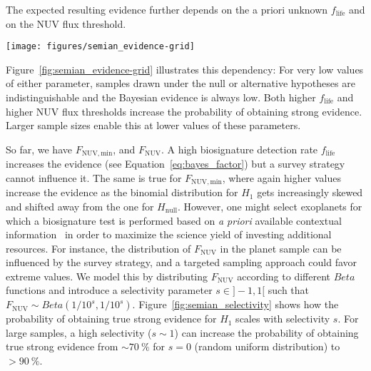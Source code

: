 \documentclass[twocolumn,twocolappendix,linenumbers]{aastex631}
\begin{document}
The expected resulting evidence further depends on the a priori unknown  $f_\mathrm{life}$ and on the \gls{NUV} flux threshold.
\begin{figure*}
    \begin{centering}
        \texttt{[image: figures/semian\_evidence-grid]}
        \caption{Probability of obtaining true strong evidence for different abiogenesis rates, \gls{NUV} flux thresholds, and sample sizes. For each of these parameters, higher values increase the probability of yielding strong evidence.}
        \label{fig:semian_evidence-grid}
    \end{centering}
\end{figure*}
Figure~\ref{fig:semian_evidence-grid} illustrates this dependency: For very low values of either parameter, samples drawn under the null or alternative hypotheses are indistinguishable and the Bayesian evidence is always low.
Both higher $f_\mathrm{life}$ and higher \gls{NUV} flux thresholds increase the probability of obtaining strong evidence.
Larger sample sizes enable this at lower values of these parameters.


So far, we have  $F_\mathrm{NUV, min}$, and $F_\mathrm{NUV}$. %
A high biosignature detection rate $f_\mathrm{life}$ increases the evidence (see Equation~\ref{eq:bayes_factor}) but a survey strategy cannot influence it.
The same is true for $F_\mathrm{NUV, min}$, where again higher values increase the evidence as the binomial distribution for $H_\mathrm{1}$ gets increasingly skewed and shifted away from the one for $H_\mathrm{null}$.
However, one might select exoplanets for which a biosignature test is performed based on \textit{a priori} available contextual information~\citep{catling2018exoplanet} in order to maximize the science yield of investing additional resources.
For instance, the distribution of $F_\mathrm{NUV}$ in the planet sample can be influenced by the survey strategy, and a targeted sampling approach could favor extreme values. %
We model this by distributing $F_\mathrm{NUV}$ according to different $Beta$ functions and introduce a selectivity parameter $s\in]-1,1[$ such that $F_\mathrm{NUV} \sim Beta(1/10^s,1/10^s)$.
Figure~\ref{fig:semian_selectivity} shows how the probability of obtaining true strong evidence for $H_\mathrm{1}$ scales with selectivity $s$.
For large samples, a high selectivity ($s \sim 1$) can increase the probability of obtaining true strong evidence from $\sim \SI{70}{\percent}$ for $s= 0$ (random uniform distribution) to $> \SI{90}{\percent}$.
\end{document}
